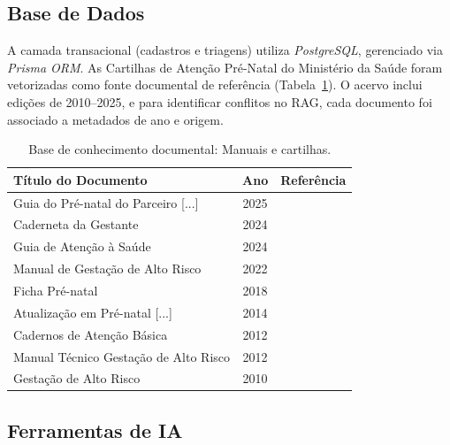 \documentclass[12pt]{article}
\begin{document}
\subsection{Base de Dados}

A camada transacional (cadastros e triagens) utiliza \textit{PostgreSQL}, gerenciado via \textit{Prisma ORM}. 
As Cartilhas de Atenção Pré-Natal do Ministério da Saúde foram vetorizadas como fonte documental de referência (Tabela~\ref{tab:cartilhas_sus}).
O acervo inclui edições de 2010--2025, e para identificar conflitos no RAG, cada documento foi associado a metadados de ano e origem.

\begin{table}[b!]
  \centering
  \caption{Base de conhecimento documental: Manuais e cartilhas.}
  \label{tab:cartilhas_sus}
  \begin{tabular}{l c c}
    \toprule
        \textbf{Título do Documento} & \textbf{Ano} & \textbf{Referência} \\ 
    \midrule
        Guia do Pré-natal do Parceiro [...]     & 2025 & \cite{GuiaPreNatalParceiro2025} \\
        Caderneta da Gestante                   & 2024 & \cite{CadernetaGestante2024} \\
        Guia de Atenção à Saúde                 & 2024 & \cite{GuiaAtencaoGestanteMG2024} \\
        Manual de Gestação de Alto Risco        & 2022 & \cite{ManualAltoRisco2022} \\
        Ficha Pré-natal                         & 2018 & \cite{FichaPreNatal2018} \\
        Atualização em Pré-natal [...]          & 2014 & \cite{AtualizacaoPreNatalSC2014} \\
        Cadernos de Atenção Básica              & 2012 & \cite{CadernosAtencaoBasica32} \\
        Manual Técnico Gestação de Alto Risco   & 2012 & \cite{ManualAltoRisco2012} \\
        Gestação de Alto Risco                  & 2010 & \cite{ManualAltoRisco2010} \\
    \bottomrule
  \end{tabular}
\end{table}

\subsection{Ferramentas de IA}
\end{document}
